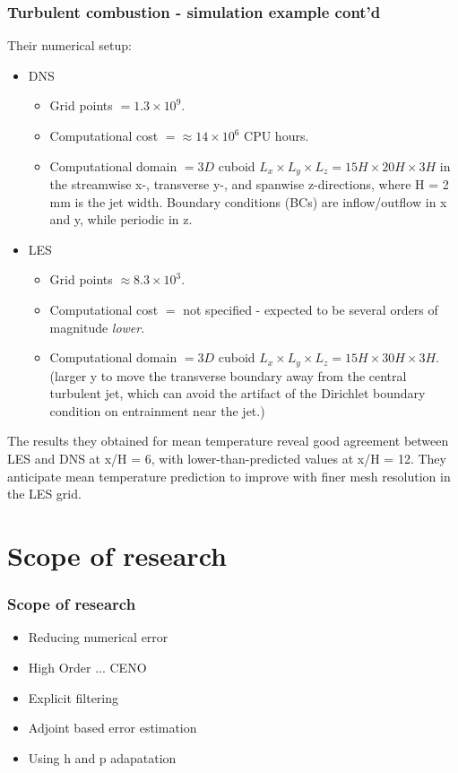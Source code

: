 \documentclass{beamer}
\begin{document}
\begin{frame}%
\frametitle{Turbulent combustion - simulation example cont'd}
\scriptsize
Their numerical setup:
\begin{itemize}
\item DNS 
\begin{itemize}
\tiny
\item Grid points $ = 1.3 \times 10^9$.  
\item Computational cost $ = \approx 14 \times 10^6$ CPU hours.
\item Computational domain $ = 3D $ cuboid  $L_x \times L_y \times L_z = 15H \times 20H \times 3H$ in the streamwise x-, transverse y-, and spanwise z-directions, where H = 2 mm is the jet width. Boundary conditions (BCs) are inflow/outflow in x and y, while periodic in z.
\end{itemize}
\item LES
\begin{itemize}
\tiny
\item Grid points $ \approx 8.3 \times 10^3$.  
\item Computational cost $ = $ not specified - expected to be several orders of magnitude \textit{lower}.
\item Computational domain $ = 3D $ cuboid $  L_x \times L_y \times L_z = 15H \times 30H \times 3H$. (larger y to move the transverse boundary away from the central turbulent jet, which can avoid the artifact of the Dirichlet boundary condition on entrainment near the jet.)
\end{itemize}
\end{itemize}
The results they obtained for mean temperature reveal good agreement between LES and DNS at x/H = 6, with lower-than-predicted values at x/H = 12. They anticipate mean temperature prediction to improve with finer mesh resolution in the LES grid.

\end{frame}

\section[Scope]{Scope of research}
\begin{frame}%
\frametitle{Scope of research}
\scriptsize
\begin{itemize}
\item Reducing numerical error
\item High Order ... CENO
\item Explicit filtering
\item Adjoint based error estimation
\item Using h and p adapatation
\end{itemize}
\end{frame}
\end{document}
